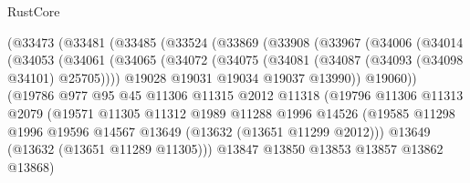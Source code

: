 \begin{lexlean}{RustCore}
\begin{coremodule}
                  (@33473
                    (@33481
                      (@33485
                        (@33524
                          (@33869
                            (@33908
                              (@33967
                                (@34006
                                  (@34014
                                    (@34053
                                      (@34061
                                        (@34065
                                          (@34072
                                            (@34075
                                              (@34081 (@34087 (@34093 (@34098 @34101) @25705))))
                                            @19028
                                            @19031
                                            @19034
                                            @19037
                                            @13990))
                                        @19060))
                                    (@19786
                                      @977
                                      @95
                                      @45
                                      @11306
                                      @11315
                                      @2012
                                      @11318
                                      (@19796
                                        @11306
                                        @11313
                                        @2079
                                        (@19571
                                          @11305
                                          @11312
                                          @1989
                                          @11288
                                          @1996
                                          @14526
                                          (@19585
                                            @11298
                                            @1996
                                            @19596
                                            @14567
                                            @13649
                                            (@13632 (@13651 @11299 @2012)))
                                          @13649
                                          (@13632 (@13651 @11289 @11305)))
                                        @13847
                                        @13850
                                        @13853
                                        @13857
                                        @13862
                                        @13868)

\end{coremodule}
\end{lexlean}
